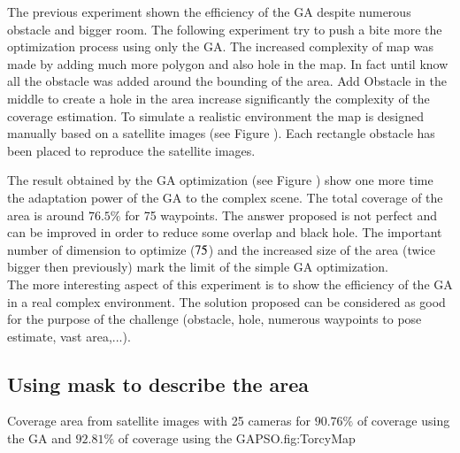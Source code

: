 The previous experiment shown the efficiency of the GA despite numerous obstacle and bigger room. The following experiment try to push a bite more the optimization process using only the GA. The increased complexity of map was made by adding much more polygon and also hole in the map. In fact until know all the obstacle was added around the bounding of the area. Add Obstacle in the middle to create a hole in the area increase significantly the complexity of the coverage estimation.
To simulate a realistic environment the map is designed manually based on a satellite images (see Figure ). Each rectangle obstacle has been placed to reproduce the satellite images. 

The result obtained by the GA optimization (see Figure ) show one more time the adaptation power of the GA to the complex scene. The total coverage of the area is around $76.5\%$ for 75 waypoints. The answer proposed is not perfect and can be improved in order to reduce some overlap and black hole. The important number of dimension to optimize ($75\time 4$) and the increased size of the area (twice bigger then previously) mark the limit of the simple GA optimization.\\
	The more interesting aspect of this experiment is to show the efficiency of the GA in a real complex environment. The solution proposed can be considered as good for the purpose of the challenge (obstacle, hole, numerous waypoints to pose estimate, vast area,...). 
  

	
	\subsection{Using mask to describe the area }\label{sec:maskGAPSO}

\begin{mfigures}[!]
{Coverage area from satellite images with 25 cameras for $90.76\%$ of coverage using the GA and $92.81\%$ of coverage using the GAPSO.}{fig:TorcyMap} \centering
{}
\hspace{1cm}
\hspace{1cm}
\tabsimuposeTorcy
\end{mfigures}


